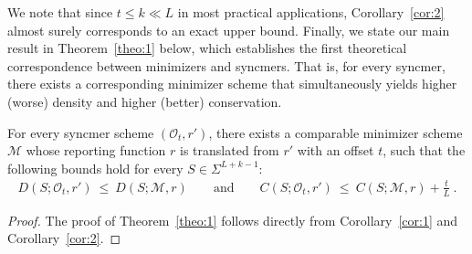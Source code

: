 \vspace{-3mm}
We note that since $t \leq k \ll L$ in most practical applications, Corollary~\ref{cor:2} almost surely corresponds to an exact upper bound. Finally, we state our main result in Theorem~\ref{theo:1} below, which establishes the first theoretical correspondence between minimizers and syncmers. That is, for every syncmer, there exists a corresponding minimizer scheme that simultaneously yields higher (worse) density and higher (better) conservation.

\begin{theorem} For every syncmer scheme $(\mathcal{O}_t, r')$, there exists a comparable minimizer scheme $\mathcal{M}$ whose reporting function $r$ is translated from $r'$ with an offset $t$, such that the following bounds hold for every $S \in \Sigma^{L+k-1}$: 
\begin{eqnarray}
D(S; \mathcal{O}_t,r') \ \leq 
 \ D(S; \mathcal{M},r) \qquad \text{and} \qquad  C(S; \mathcal{O}_t,r') \ \leq \ C(S; \mathcal{M},r) + \frac{t}{L} \ .
\end{eqnarray}
\begin{proof}
The proof of Theorem~\ref{theo:1} follows directly from Corollary~\ref{cor:1} and Corollary~\ref{cor:2}.
\end{proof}
\label{theo:1}
\end{theorem}
\vspace{-5mm}
